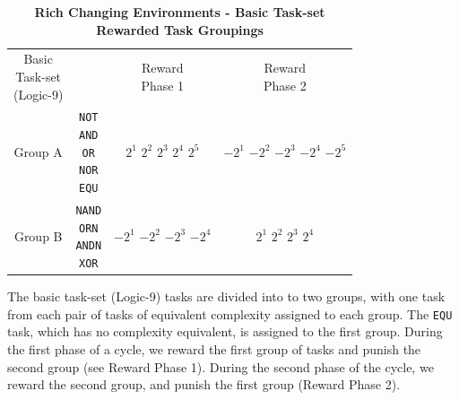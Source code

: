 \documentclass[PhD]{msu-thesis}
\begin{document}
	\begin{table}[]
	\centering
	\caption{\textbf{Rich Changing Environments - Basic Task-set Rewarded Task Groupings}}
	\label{lte-complex-treatments-logic9-h}

	\begin{tabular}{|c|c|c|c|}
	\hline
	 \thead{Basic\\Task-set\\(Logic-9)}& \thead{Tasks} & \thead{Reward \\ Phase 1} & \thead{Reward \\ Phase 2} \\\hhline{|=|=|=|=|}
	 Group A & \makecell{ \texttt{NOT} \\ \texttt{AND} \\ \texttt{OR} \\ \texttt{NOR} \\ \texttt{EQU} } & \makecell{ $2^1$ \\ $2^2$ \\ $2^3$ \\ $2^4$ \\ $2^5$ } & \makecell{ $-2^{1}$ \\ $-2^{2}$ \\ $-2^{3}$ \\ $-2^{4}$ \\ $-2^{5}$ } \\\hline
	 Group B & \makecell{ \texttt{NAND} \\ \texttt{ORN} \\ \texttt{ANDN} \\ \texttt{XOR} } & \makecell{ $-2^{1}$ \\ $-2^{2}$ \\ $-2^{3}$ \\ $-2^{4}$ } & \makecell{ $2^1$ \\ $2^2$ \\ $2^3$ \\ $2^4$ } \\\hline
	\end{tabular} 

	\begin{flushleft}The basic task-set (Logic-9) tasks are divided into to two groups, with one task from each pair of tasks of equivalent complexity assigned to each group. The \texttt{EQU} task, which has no complexity equivalent, is assigned to the first group. During the first phase of a cycle, we reward the first group of tasks and punish the second group (see Reward Phase 1). During the second phase of the cycle, we reward the second group, and punish the first group (Reward Phase 2).  
	\end{flushleft}
	\label{lte-complex-treatments-logic9}
	\end{table}
\end{document}
